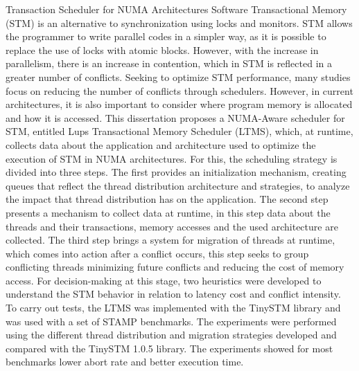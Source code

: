 \documentclass[diss,capa]{texufpel}
\begin{document}
\begin{englishabstract}{Transaction Scheduler for NUMA Architectures}
Software Transactional Memory (STM) is an alternative to synchronization using locks and monitors. STM allows the programmer to write parallel codes in a simpler way, as it is possible to replace the use of locks with atomic blocks. However, with the increase in parallelism, there is an increase in contention, which in STM is reflected in a greater number of conflicts. Seeking to optimize STM performance, many studies focus on reducing the number of conflicts through schedulers. However, in current architectures, it is also important to consider where program memory is allocated and how it is accessed. This dissertation proposes a NUMA-Aware scheduler for STM, entitled Lups Transactional Memory Scheduler (LTMS), which, at runtime, collects data about the application and architecture used to optimize the execution of STM in NUMA architectures. For this, the scheduling strategy is divided into three steps. The first provides an initialization mechanism, creating queues that reflect the thread distribution architecture and strategies, to analyze the impact that thread distribution has on the application. The second step presents a mechanism to collect data at runtime, in this step data about the threads and their transactions, memory accesses and the used architecture are collected. The third step brings a system for migration of threads at runtime, which comes into action after a conflict occurs, this step seeks to group conflicting threads minimizing future conflicts and reducing the cost of memory access. For decision-making at this stage, two heuristics were developed to understand the STM behavior in relation to latency cost and conflict intensity. To carry out tests, the LTMS was implemented with the TinySTM library and was used with a set of STAMP benchmarks. The experiments were performed using the different thread distribution and migration strategies developed and compared with the TinySTM 1.0.5 library. The experiments showed for most benchmarks lower abort rate and better execution time.
\end{englishabstract}

\listoffigures

\listoftables
\end{document}
